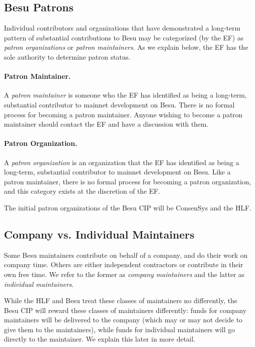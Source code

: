 \subsection{Besu Patrons}
Individual contributors and organizations that have demonstrated a long-term pattern of substantial contributions to Besu may be categorized (by the EF) as \emph{patron organizations} or \emph{patron maintainers}.  As we explain below, the EF has the sole authority to determine patron status.

\paragraph{Patron Maintainer.}  A \emph{patron maintainer} is someone who the EF has identified as being a long-term, substantial contributor to mainnet development on Besu.  There is no formal process for becoming a patron maintainer.  Anyone wishing to become a patron maintainer should contact the EF and have a discussion with them.

\paragraph{Patron Organization.}  A \emph{patron organization} is an organization that the EF has identified as being a long-term, substantial contributor to mainnet development on Besu.  Like a patron maintainer, there is no formal process for becoming a patron organization, and this category exists at the discretion of the EF.

The initial patron organizations of the Besu CIP will be ConsenSys and the HLF.

\subsection{Company vs. Individual Maintainers}
Some Besu maintainers contribute on behalf of a company, and do their work on company time.  Others are either independent contractors or contribute in their own free time.  We refer to the former as \emph{company maintainers} and the latter as \emph{individual maintainers}.

While the HLF and Besu treat these classes of maintainers no differently, the Besu CIP will reward these classes of maintainers differently:  funds for company maintainers will be delivered to the company (which may or may not decide to give them to the maintainers), while funds for individual maintainers will go directly to the maintainer.  We explain this later in more detail.

